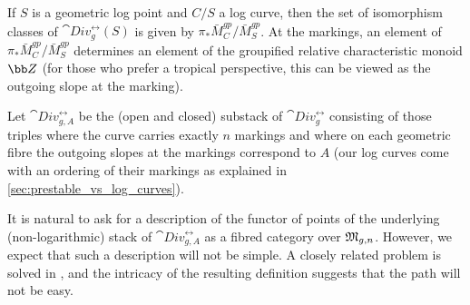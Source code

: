 If $S$ is a geometric log point and $C/S$ a log curve, then the set of isomorphism classes of $\cat{Div}_g^{\rel}(S)$ is given by $\pi_*\bar M_C^{gp}/\bar M_S^{gp}$. At the markings, an element of $\pi_*\bar M_C^{gp}/\bar M_S^{gp}$ determines an element of the groupified relative characteristic monoid $\bb Z$ (for those who prefer a tropical perspective, this can be viewed as the outgoing slope at the marking).

\begin{definition}
\notready
Let $\cat{Div}^{\rel}_{g,A}$ be the (open and closed) substack of $\cat{Div}^{\rel}_g$ consisting of those triples where the curve carries exactly $n$ markings and where on each geometric fibre the outgoing slopes at the markings correspond to $A$ (our
log curves come with an ordering of their markings as explained in \cref{sec:prestable_vs_log_curves}).
\end{definition}



\begin{remark}
\notready
It is natural to ask for a description of the functor of points of the underlying (non-logarithmic) stack of $\cat{Div}^{\rel}_{g,A}$ as a fibred category over $\frak M_{g,n}$. However, we expect that such a description will not be simple. A closely related problem is solved in \cite{Biesel2016Fine-compactifi}, and the intricacy of the resulting definition suggests that the path will not be easy.
\end{remark}


